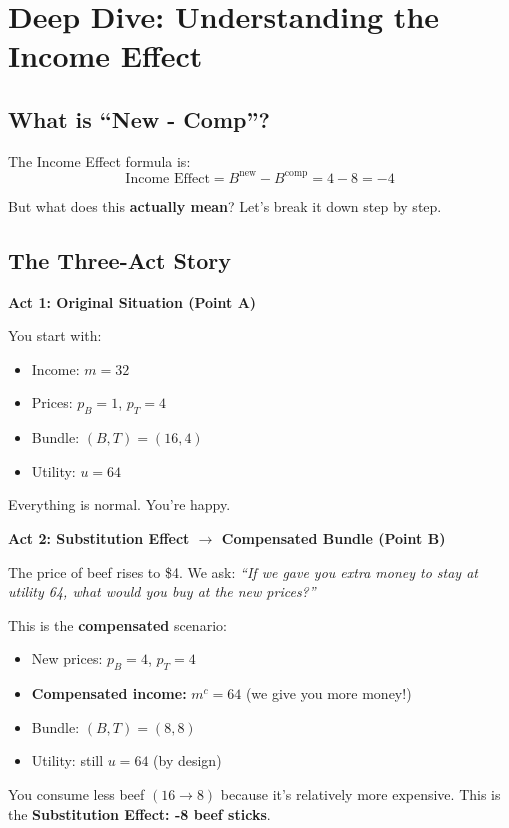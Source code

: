 \documentclass[11pt]{article}
\begin{document}
\section{Deep Dive: Understanding the Income Effect}

\subsection{What is ``New - Comp''?}

The Income Effect formula is:
$$\boxed{\text{Income Effect} = B^{\text{new}} - B^{\text{comp}} = 4 - 8 = -4}$$

But what does this \textbf{actually mean}? Let's break it down step by step.

\subsection{The Three-Act Story}

\textbf{Act 1: Original Situation (Point A)}

You start with:
\begin{itemize}
    \item Income: $m = 32$
    \item Prices: $p_B = 1$, $p_T = 4$
    \item Bundle: $(B, T) = (16, 4)$
    \item Utility: $u = 64$
\end{itemize}

Everything is normal. You're happy.

\textbf{Act 2: Substitution Effect $\to$ Compensated Bundle (Point B)}

The price of beef rises to \$4. We ask: \textit{``If we gave you extra money to stay at utility 64, what would you buy at the new prices?''}

This is the \textbf{compensated} scenario:
\begin{itemize}
    \item New prices: $p_B = 4$, $p_T = 4$
    \item \textbf{Compensated income:} $m^c = 64$ (we give you more money!)
    \item Bundle: $(B, T) = (8, 8)$
    \item Utility: still $u = 64$ (by design)
\end{itemize}

You consume less beef $(16 \to 8)$ because it's relatively more expensive. This is the \textbf{Substitution Effect: -8 beef sticks}.
\end{document}
